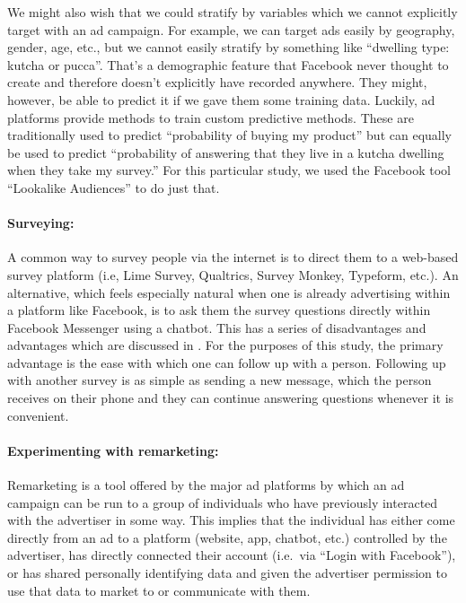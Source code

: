\documentclass[a4paper,12pt]{article}
\begin{document}
We might also wish that we could stratify by variables which we cannot explicitly target with an ad campaign. For example, we can target ads easily by geography, gender, age, etc., but we cannot easily stratify by something like ``dwelling type: kutcha or pucca''. That's a demographic feature that Facebook never thought to create and therefore doesn't explicitly have recorded anywhere. They might, however, be able to predict it if we gave them some training data. Luckily, ad platforms provide methods to train custom predictive methods. These are traditionally used to predict ``probability of buying my product'' but can equally be used to predict ``probability of answering that they live in a kutcha dwelling when they take my survey.'' For this particular study, we used the Facebook tool ``Lookalike Audiences'' to do just that.

\paragraph{Surveying:} A common way to survey people via the internet is to direct them to a web-based survey platform (i.e, Lime Survey, Qualtrics, Survey Monkey, Typeform, etc.). An alternative, which feels especially natural when one is already advertising within a platform like Facebook, is to ask them the survey questions directly within Facebook Messenger using a chatbot. This has a series of disadvantages and advantages which are discussed in \cite{Rao2020}. For the purposes of this study, the primary advantage is the ease with which one can follow up with a person. Following up with another survey is as simple as sending a new message, which the person receives on their phone and they can continue answering questions whenever it is convenient.


\paragraph{Experimenting with remarketing:} Remarketing is a tool offered by the major ad platforms by which an ad campaign can be run to a group of individuals who have previously interacted with the advertiser in some way. This implies that the individual has either come directly from an ad to a platform (website, app, chatbot, etc.) controlled by the advertiser, has directly connected their account (i.e.\ via ``Login with Facebook''), or has shared personally identifying data and given the advertiser permission to use that data to market to or communicate with them.
\end{document}
